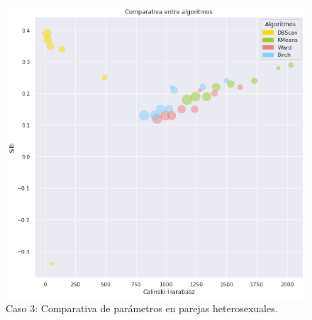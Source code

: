 \documentclass[11pt,a4paper]{article}
\begin{document}
	\begin{figure}[] 
		\centering
		\includegraphics[scale=0.5]{../Caso3/hetero/bubbles}
		\caption{Caso 3: Comparativa de parámetros en parejas heterosexuales.} \label{bubbles3}
	\end{figure}
	
\end{document}
